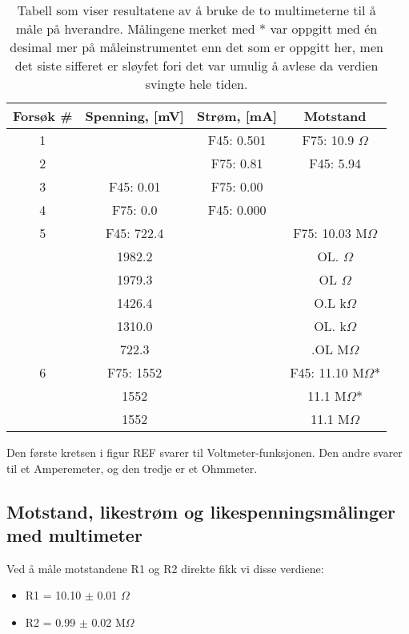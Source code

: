 \documentclass[reprint, english,notitlepage]{revtex4-1}  %
\begin{document}
\begin{table}[p]
\label{fig:tabell_multimetre}
\caption{Tabell som viser resultatene av å bruke de to multimeterne til å måle på hverandre. Målingene merket med * var oppgitt med én desimal mer på måleinstrumentet enn det som er oppgitt her, men det siste sifferet er sløyfet fori det var umulig å avlese da verdien svingte hele tiden.}

\begin{adjustbox}{width=\linewidth}
\begin{tabular}{||c | c | c | c||}
\hline
Forsøk \# & Spenning, [mV] & Strøm, [mA] & Motstand  \\ \hline\hline
1 &            & F45: 0.501 & F75: 10.9 $\Omega$    \\ \hline
2 &            & F75: 0.81  & F45: 5.94             \\ \hline
3 & F45: 0.01  & F75: 0.00  &                       \\ \hline
4 & F75: 0.0   & F45: 0.000 &                       \\ \hline
5 & F45: 722.4 &            & F75: 10.03 M$\Omega$  \\ \hline
  &     1982.2 &            &        OL. $\Omega$   \\ \hline
  &     1979.3 &            &        OL $\Omega$    \\ \hline
  &     1426.4 &            &        O.L k$\Omega$  \\ \hline
  &     1310.0 &            &        OL. k$\Omega$  \\ \hline
  &      722.3 &            &        .OL  M$\Omega$ \\ \hline
6 & F75:  1552 &            & F45: 11.10 M$\Omega$*  \\ \hline
  &       1552 &            & 11.1 M$\Omega$*        \\ \hline
  &       1552 &            & 11.1 M$\Omega$         \\ \hline
\end{tabular}
\end{adjustbox}
\end{table}

Den første kretsen i figur REF svarer til Voltmeter-funksjonen. Den andre svarer til et Amperemeter, og den tredje er et Ohmmeter.


\subsection{Motstand, likestrøm og likespenningsmålinger med multimeter}
Ved å måle motstandene R1 og R2 direkte fikk vi disse verdiene:
\begin{itemize}
  \item R1 = 10.10 $\pm$ 0.01 $\Omega$
  \item R2 = 0.99 $\pm$ 0.02 M$\Omega$
\end{itemize}
\end{document}
